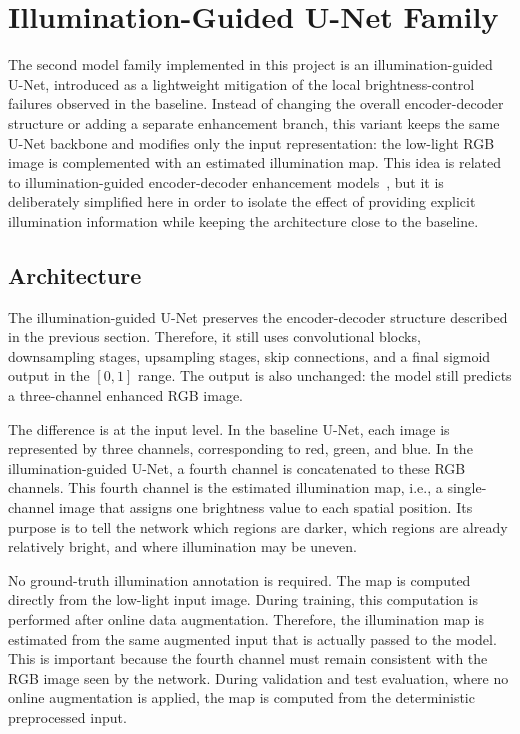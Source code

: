 \section{Illumination-Guided U-Net Family}

The second model family implemented in this project is an illumination-guided U-Net, introduced as a lightweight mitigation of the local brightness-control failures observed in the baseline. Instead of changing the overall encoder-decoder structure or adding a separate enhancement branch, this variant keeps the same U-Net backbone and modifies only the input representation: the low-light RGB image is complemented with an estimated illumination map. This idea is related to illumination-guided encoder-decoder enhancement models~\cite{DBLP:journals/corr/abs-2507-13360}, but it is deliberately simplified here in order to isolate the effect of providing explicit illumination information while keeping the architecture close to the baseline.

\subsection{Architecture}

The illumination-guided U-Net preserves the encoder-decoder structure described in the previous section. Therefore, it still uses convolutional blocks, downsampling stages, upsampling stages, skip connections, and a final sigmoid output in the $[0,1]$ range. The output is also unchanged: the model still predicts a three-channel enhanced RGB image.

The difference is at the input level. In the baseline U-Net, each image is represented by three channels, corresponding to red, green, and blue. In the illumination-guided U-Net, a fourth channel is concatenated to these RGB channels. This fourth channel is the estimated illumination map, i.e., a single-channel image that assigns one brightness value to each spatial position. Its purpose is to tell the network which regions are darker, which regions are already relatively bright, and where illumination may be uneven.

No ground-truth illumination annotation is required. The map is computed directly from the low-light input image. During training, this computation is performed after online data augmentation. Therefore, the illumination map is estimated from the same augmented input that is actually passed to the model. This is important because the fourth channel must remain consistent with the RGB image seen by the network. During validation and test evaluation, where no online augmentation is applied, the map is computed from the deterministic preprocessed input.

